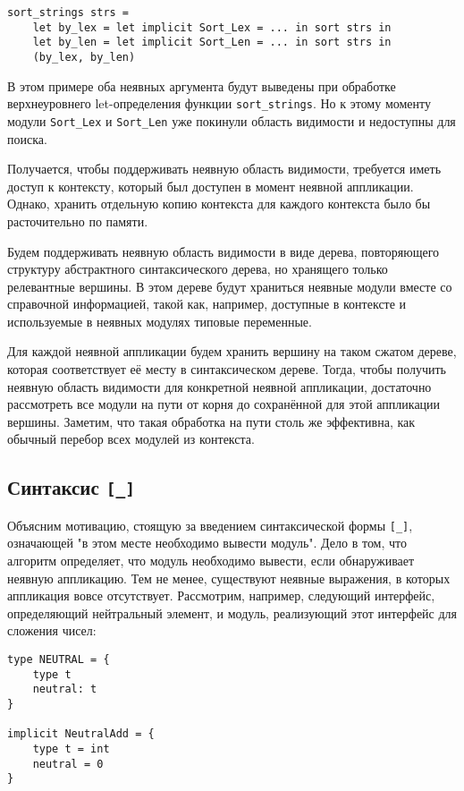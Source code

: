\documentclass[../diploma.tex]{subfiles}
\begin{document}
\begin{verbatim}
sort_strings strs = 
    let by_lex = let implicit Sort_Lex = ... in sort strs in
    let by_len = let implicit Sort_Len = ... in sort strs in
    (by_lex, by_len)
\end{verbatim}

В этом примере оба неявных аргумента будут выведены при обработке верхнеуровнего let-определения функции \texttt{sort_strings}. Но к этому моменту модули \texttt{Sort_Lex} и \texttt{Sort_Len} уже покинули область видимости и недоступны для поиска.

Получается, чтобы поддерживать неявную область видимости, требуется иметь доступ к контексту, который был доступен в момент неявной аппликации. Однако, хранить отдельную копию контекста для каждого контекста было бы расточительно по памяти. 

Будем поддерживать неявную область видимости в виде дерева, повторяющего структуру абстрактного синтаксического дерева, но хранящего только релевантные вершины. В этом дереве будут храниться неявные модули вместе со справочной информацией, такой как, например, доступные в контексте и используемые в неявных модулях типовые переменные. 

Для каждой неявной аппликации будем хранить вершину на таком сжатом дереве, которая соответствует её месту в синтаксическом дереве. Тогда, чтобы получить неявную область видимости для конкретной неявной аппликации, достаточно рассмотреть все модули на пути от корня до сохранённой для этой аппликации вершины. Заметим, что такая обработка на пути столь же эффективна, как обычный перебор всех модулей из контекста. 

\subsection{Синтаксис \texttt{[_]}}\label{underscore}

Объясним мотивацию, стоящую за введением синтаксической формы \texttt{[_]}, означающей "в этом месте необходимо вывести модуль". Дело в том, что алгоритм определяет, что модуль необходимо вывести, если обнаруживает неявную аппликацию. Тем не менее, существуют неявные выражения, в которых аппликация вовсе отсутствует. Рассмотрим, например, следующий интерфейс, определяющий нейтральный элемент, и модуль, реализующий этот интерфейс для сложения чисел:

\begin{verbatim}
type NEUTRAL = {
    type t
    neutral: t
}

implicit NeutralAdd = {
    type t = int
    neutral = 0
}
\end{verbatim}
\end{document}
